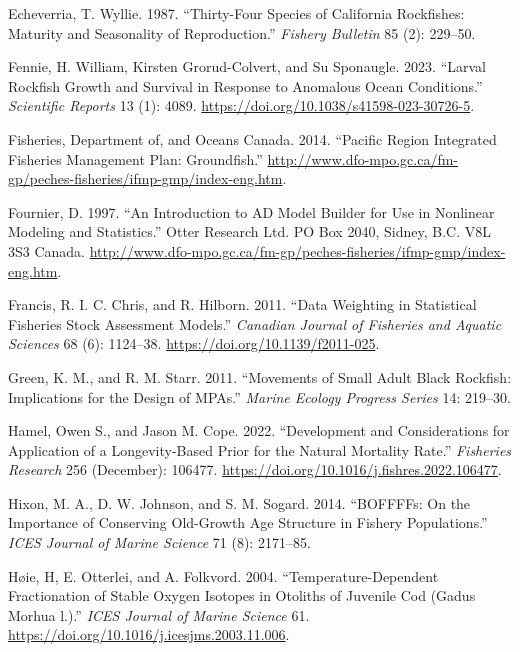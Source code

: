 \documentclass[11pt,
  english,
  letterpaper,
]{article}
\newlength{\cslhangindent}
\newenvironment{CSLReferences}[2] %
 {%
  \setlength{\parindent}{0pt}
  \ifodd #1 \everypar{\setlength{\hangindent}{\cslhangindent}}\ignorespaces\fi
  \ifnum #2 > 0
  \setlength{\parskip}{#2\baselineskip}
  \fi
 }%
 {}
\begin{document}
\begin{CSLReferences}{1}{0}
\leavevmode{}%
Echeverria, T. Wyllie. 1987. {``Thirty-Four Species of California Rockfishes: Maturity and Seasonality of Reproduction.''} \emph{Fishery Bulletin} 85 (2): 229--50.

\leavevmode{}%
Fennie, H. William, Kirsten Grorud-Colvert, and Su Sponaugle. 2023. {``Larval Rockfish Growth and Survival in Response to Anomalous Ocean Conditions.''} \emph{Scientific Reports} 13 (1): 4089. \url{https://doi.org/10.1038/s41598-023-30726-5}.

\leavevmode{}%
Fisheries, Department of, and Oceans Canada. 2014. {``Pacific Region Integrated Fisheries Management Plan: Groundfish.''} \url{http://www.dfo-mpo.gc.ca/fm-gp/peches-fisheries/ifmp-gmp/index-eng.htm}.

\leavevmode{}%
Fournier, D. 1997. {``An Introduction to AD Model Builder for Use in Nonlinear Modeling and Statistics.''} Otter Research Ltd. PO Box 2040, Sidney, B.C. V8L 3S3 Canada. \url{http://www.dfo-mpo.gc.ca/fm-gp/peches-fisheries/ifmp-gmp/index-eng.htm}.

\leavevmode{}%
Francis, R. I. C. Chris, and R. Hilborn. 2011. {``Data Weighting in Statistical Fisheries Stock Assessment Models.''} \emph{Canadian Journal of Fisheries and Aquatic Sciences} 68 (6): 1124--38. \url{https://doi.org/10.1139/f2011-025}.

\leavevmode{}%
Green, K. M., and R. M. Starr. 2011. {``Movements of Small Adult Black Rockfish: Implications for the Design of MPAs.''} \emph{Marine Ecology Progress Series} 14: 219--30.

\leavevmode{}%
Hamel, Owen S., and Jason M. Cope. 2022. {``Development and Considerations for Application of a Longevity-Based Prior for the Natural Mortality Rate.''} \emph{Fisheries Research} 256 (December): 106477. \url{https://doi.org/10.1016/j.fishres.2022.106477}.

\leavevmode{}%
Hixon, M. A., D. W. Johnson, and S. M. Sogard. 2014. {``BOFFFFs: On the Importance of Conserving Old-Growth Age Structure in Fishery Populations.''} \emph{ICES Journal of Marine Science} 71 (8): 2171--85.

\leavevmode{}%
Høie, H, E. Otterlei, and A. Folkvord. 2004. {``Temperature-Dependent Fractionation of Stable Oxygen Isotopes in Otoliths of Juvenile Cod (Gadus Morhua l.).''} \emph{ICES Journal of Marine Science} 61. \url{https://doi.org/10.1016/j.icesjms.2003.11.006}.


\end{CSLReferences}
\end{document}
